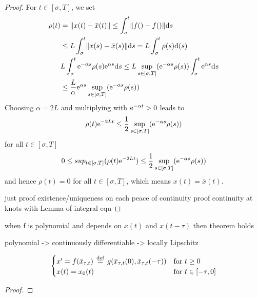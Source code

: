 \documentclass[10pt]{article}
\begin{document}
\begin{proof}
    For $t\in [\sigma,T]$, we set
    \begin{align*}
        \rho(t) &= \lVert x(t)-\bar{x}(t)\rVert \leq \int_\sigma^t \lVert f()-f()\rVert\text{d}s\\
        & \leq L \int_\sigma^t \lVert x(s)-\bar{x}(s)\rVert\text{d}s = L \int_\sigma^t \rho(s)\text{d}(s)\\
        & L \int_\sigma^t \text{e}^{-\alpha s}\rho(s)\text{e}^{\alpha s}\text{d}s \leq L \sup_{s\in [\sigma,T]}(\text{e}^{-\alpha s}\rho(s))\int_\sigma^t \text{e}^{\alpha s}\text{d}s\\
        & \leq\frac{L}{\alpha}\text{e}^{\alpha s} \sup_{s\in [\sigma,T]}(\text{e}^{-\alpha s}\rho(s))
    \end{align*}
    Choosing $\alpha=2L$ and multiplying with $\text{e}^{-\alpha t}>0$ leads to
    \begin{equation}
        \rho(t)\text{e}^{-2Lt} \leq \frac{1}{2}\sup_{s\in [\sigma,T]}(\text{e}^{-\alpha s}\rho(s))
    \end{equation}
    for all $t\in [\sigma,T]$
    \begin{equation}
        0 \leq sup_{t\in [\sigma,T]}(\rho(t)\text{e}^{-2Lt}) \leq \frac{1}{2}\sup_{s\in [\sigma,T]}(\text{e}^{-\alpha s}\rho(s))
    \end{equation}
    and hence $\rho(t)=0$ for all $t\in [\sigma,T]$, which means $x(t)=\bar{x}(t)$.

    just proof existence/uniqueness on each peace of continuity proof continuity at knots with Lemma of integral equ

\end{proof}

\begin{corollary}
    \label{corollary}
when f is polynomial and depends on $x(t)$ and $x(t-\tau)$ then theorem holds

polynomial -\textgreater{} continuously differentiable -\textgreater{} locally Lipschitz


\begin{equation}
    \begin{cases}
        x'=f(\bar{x}_{\tau,t})\,\stackrel{\text{def}}{=}\, g(\bar{x}_{\tau,t}(0),\bar{x}_{\tau,t}(-\tau)) &\text{for } t\geq 0\\
        x(t)=x_0(t) & \text{for } t\in[-\tau,0]
    \end{cases}
\end{equation}
\end{corollary}

\begin{proof}

\end{proof}
\end{document}
